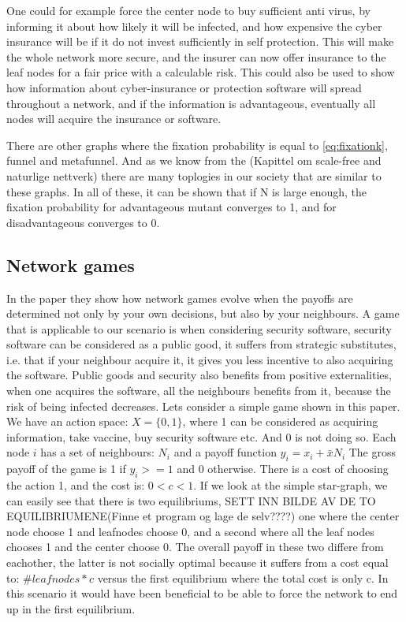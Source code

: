 One could for example force the center node to buy sufficient anti virus, 
by informing it about how likely it will be infected, and how expensive the cyber insurance will be if 
it do not invest sufficiently in self protection. This will make the whole network more secure, 
and the insurer can now offer insurance to the leaf nodes for a fair price with a calculable risk. 
This could also be used to show how information about cyber-insurance or protection software will
spread throughout a network, and if the information is advantageous, eventually all nodes will acquire
the insurance or software.
    
There are other graphs where the fixation probability is equal to \ref{eq:fixationk}, funnel and
metafunnel. And as we know from the (Kapittel om scale-free and naturlige nettverk) there are many
toplogies in our society that are similar to these graphs.  In all of these, it can be
shown that if N is large enough, the fixation probability for advantageous mutant converges to 1, 
and for disadvantageous converges to 0.

\subsection{Network games}
In the paper \cite{networkgames} they show how network games evolve when the payoffs are determined not only by your own decisions, but also by your neighbours. 
A game that is applicable to our scenario is when considering security software, 
security software can be considered as a public good, it suffers from strategic substitutes, i.e. 
that if your neighbour acquire it, it gives you less incentive to also acquiring the software. 
Public goods and security also benefits from positive externalities, when one acquires the software, 
all the neighbours benefits from it, because the risk of being infected decreases.
Lets consider a simple game shown in this paper.
We have an action space: $X=\{0,1\}$, where 1 can be considered as acquiring information, take vaccine, buy security software etc. And 0 is not doing so.
Each node $i$ has a set of neighbours: $N_{i} $ and a payoff function $y_{i}=x_{i}+\bar{x}N_{i}$
The gross payoff of the game is 1 if $y_{i}>=1$ and 0 otherwise. There is a cost of choosing the action 1, and the cost is: $0<c<1$.
 If we look at the simple star-graph, we can easily see that there is two equilibriums, 
 SETT INN BILDE AV DE TO EQUILIBRIUMENE(Finne et program og lage de selv????)
 one where the center node choose 1 and leafnodes choose 0, and a second where all the leaf nodes chooses 1 and the center choose 0.
The overall payoff in these two differe from eachother, the latter is not socially optimal because it
 suffers from a cost equal to: $\#leaf nodes * c$ versus the first equilibrium where the total cost is only c.
In this scenario it would have been beneficial to be able to force the network to end up in the first equilibrium. 
 

